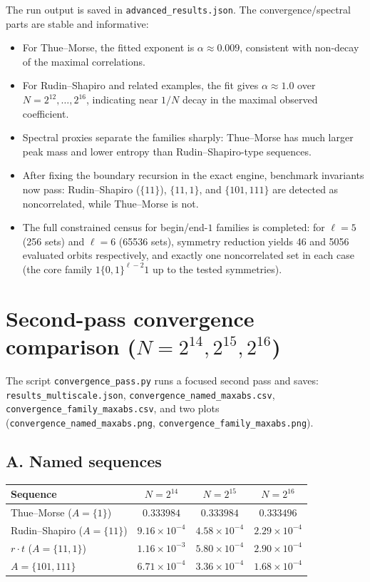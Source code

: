 \documentclass[11pt]{article}
\begin{document}
The run output is saved in \texttt{advanced\_results.json}. The convergence/spectral
parts are stable and informative:
\begin{itemize}
  \item For Thue--Morse, the fitted exponent is $\alpha\approx 0.009$, consistent with
  non-decay of the maximal correlations.
  \item For Rudin--Shapiro and related examples, the fit gives $\alpha\approx 1.0$
  over $N=2^{12},\dots,2^{16}$, indicating near $1/N$ decay in the maximal observed coefficient.
  \item Spectral proxies separate the families sharply: Thue--Morse has much larger
  peak mass and lower entropy than Rudin--Shapiro-type sequences.
  \item After fixing the boundary recursion in the exact engine, benchmark invariants now
  pass: Rudin--Shapiro ($\{11\}$), $\{11,1\}$, and $\{101,111\}$ are detected as
  noncorrelated, while Thue--Morse is not.
  \item The full constrained census for begin/end-$1$ families is completed: for
  $\ell=5$ (256 sets) and $\ell=6$ (65536 sets), symmetry reduction yields 46 and
  5056 evaluated orbits respectively, and exactly one noncorrelated set in each case
  (the core family $1\{0,1\}^{\ell-2}1$ up to the tested symmetries).
\end{itemize}

\appendix
\section{Second-pass convergence comparison ($N=2^{14},2^{15},2^{16}$)}
The script \texttt{convergence\_pass.py} runs a focused second pass and saves:
\texttt{results\_multiscale.json}, \texttt{convergence\_named\_maxabs.csv},
\texttt{convergence\_family\_maxabs.csv}, and two plots
(\texttt{convergence\_named\_maxabs.png}, \texttt{convergence\_family\_maxabs.png}).

\subsection*{A. Named sequences}
\begin{center}
\begin{tabular}{lccc}
\toprule
Sequence & $N=2^{14}$ & $N=2^{15}$ & $N=2^{16}$ \\
\midrule
Thue--Morse ($A=\{1\}$) & $0.333984$ & $0.333984$ & $0.333496$ \\
Rudin--Shapiro ($A=\{11\}$) & $9.16\times 10^{-4}$ & $4.58\times 10^{-4}$ & $2.29\times 10^{-4}$ \\
$r\cdot t$ ($A=\{11,1\}$) & $1.16\times 10^{-3}$ & $5.80\times 10^{-4}$ & $2.90\times 10^{-4}$ \\
$A=\{101,111\}$ & $6.71\times 10^{-4}$ & $3.36\times 10^{-4}$ & $1.68\times 10^{-4}$ \\
\bottomrule
\end{tabular}
\end{center}
\end{document}
